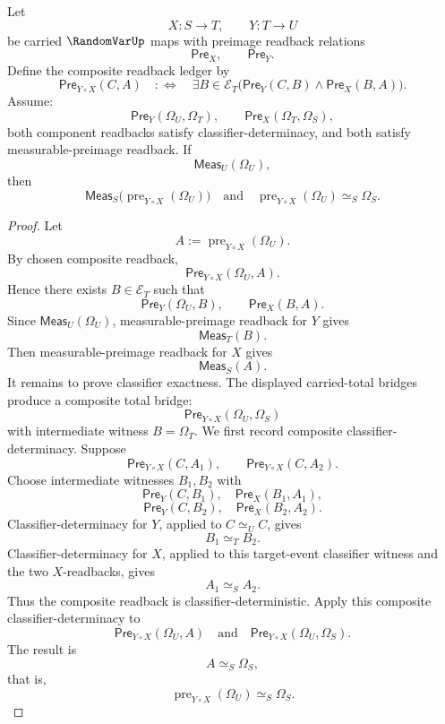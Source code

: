 \begin{theorem}
\label{thm:randomvar-composition-preserves-total-event-preimage-exactness}
Let
$$
X:S\to T,
\qquad
Y:T\to U
$$
be carried $\RandomVarUp$ maps with preimage readback relations
$$
\mathsf{Pre}_X,
\qquad
\mathsf{Pre}_Y.
$$
Define the composite readback ledger by
$$
\mathsf{Pre}_{Y\circ X}(C,A)
\quad:\Longleftrightarrow\quad
\exists B\in\mathcal E_T
\bigl(\mathsf{Pre}_Y(C,B)\wedge \mathsf{Pre}_X(B,A)\bigr).
$$
Assume:
$$
\mathsf{Pre}_Y(\Omega_U,\Omega_T),
\qquad
\mathsf{Pre}_X(\Omega_T,\Omega_S),
$$
both component readbacks satisfy classifier-determinacy, and both satisfy measurable-preimage readback. If
$$
\mathsf{Meas}_U(\Omega_U),
$$
then
$$
\mathsf{Meas}_S\bigl(\operatorname{pre}_{Y\circ X}(\Omega_U)\bigr)
\quad\text{and}\quad
\operatorname{pre}_{Y\circ X}(\Omega_U)\simeq_S\Omega_S.
$$
\end{theorem}
\begin{proof}
Let
$$
A:=\operatorname{pre}_{Y\circ X}(\Omega_U).
$$
By chosen composite readback,
$$
\mathsf{Pre}_{Y\circ X}(\Omega_U,A).
$$
Hence there exists $B\in\mathcal E_T$ such that
$$
\mathsf{Pre}_Y(\Omega_U,B),
\qquad
\mathsf{Pre}_X(B,A).
$$
Since $\mathsf{Meas}_U(\Omega_U)$, measurable-preimage readback for $Y$ gives
$$
\mathsf{Meas}_T(B).
$$
Then measurable-preimage readback for $X$ gives
$$
\mathsf{Meas}_S(A).
$$
It remains to prove classifier exactness. The displayed carried-total bridges produce a composite total bridge:
$$
\mathsf{Pre}_{Y\circ X}(\Omega_U,\Omega_S)
$$
with intermediate witness $B=\Omega_T$.
We first record composite classifier-determinacy. Suppose
$$
\mathsf{Pre}_{Y\circ X}(C,A_1),
\qquad
\mathsf{Pre}_{Y\circ X}(C,A_2).
$$
Choose intermediate witnesses $B_1,B_2$ with
$$
\mathsf{Pre}_Y(C,B_1),\quad \mathsf{Pre}_X(B_1,A_1),
$$
$$
\mathsf{Pre}_Y(C,B_2),\quad \mathsf{Pre}_X(B_2,A_2).
$$
Classifier-determinacy for $Y$, applied to $C\simeq_U C$, gives
$$
B_1\simeq_T B_2.
$$
Classifier-determinacy for $X$, applied to this target-event classifier witness and the two $X$-readbacks, gives
$$
A_1\simeq_S A_2.
$$
Thus the composite readback is classifier-deterministic.
Apply this composite classifier-determinacy to
$$
\mathsf{Pre}_{Y\circ X}(\Omega_U,A)
\quad\text{and}\quad
\mathsf{Pre}_{Y\circ X}(\Omega_U,\Omega_S).
$$
The result is
$$
A\simeq_S\Omega_S,
$$
that is,
$$
\operatorname{pre}_{Y\circ X}(\Omega_U)\simeq_S\Omega_S.
$$
\end{proof}

